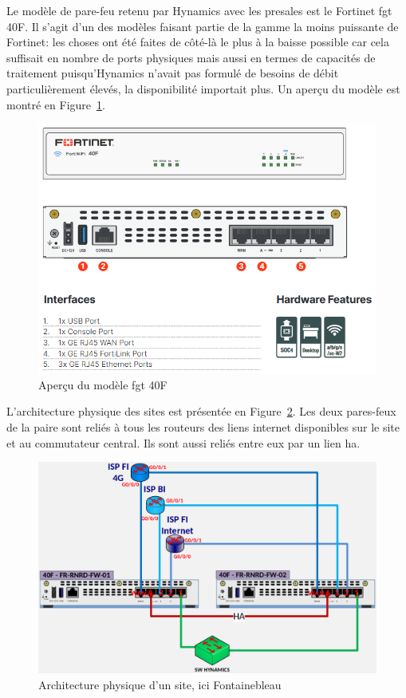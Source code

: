 \documentclass[12pt, oneside, a4paper, titlepage]{report}
\begin{document}
Le modèle de pare-feu retenu par Hynamics avec les \gls{presales} est le
Fortinet \acrlong{fgt} 40F. Il s'agit d'un des modèles faisant partie de la
gamme la moins puissante de Fortinet: les choses ont été faites de côté-là le
plus à la baisse possible car cela suffisait en nombre de ports physiques mais
aussi en termes de capacités de traitement puisqu'Hynamics n'avait pas formulé
de besoins de débit particulièrement élevés, la disponibilité importait plus.
Un aperçu du modèle est montré en Figure~\ref{fig:doc-hy/fgt-40f}.

\begin{figure}[h!]
    \centering
    \includegraphics[width = 0.8\linewidth]{img/doc-hy/fgt-40f.png}
    \caption{Aperçu du modèle \acrlong{fgt} 40F}%
    \label{fig:doc-hy/fgt-40f}
\end{figure}

L'architecture physique des sites est présentée en
Figure~\ref{fig:doc-hy/site-phys-arch}. Les deux pares-feux de la paire sont
reliés à tous les routeurs des liens internet disponibles sur le site et au
commutateur central. Ils sont aussi reliés entre eux par un lien \gls{ha}.

\begin{figure}[h!]
    \centering
    \includegraphics[width = 0.8\linewidth]{img/doc-hy/site-phys-arch.png}
    \caption{Architecture physique d'un site, ici Fontainebleau}%
    \label{fig:doc-hy/site-phys-arch}
\end{figure}
\end{document}
